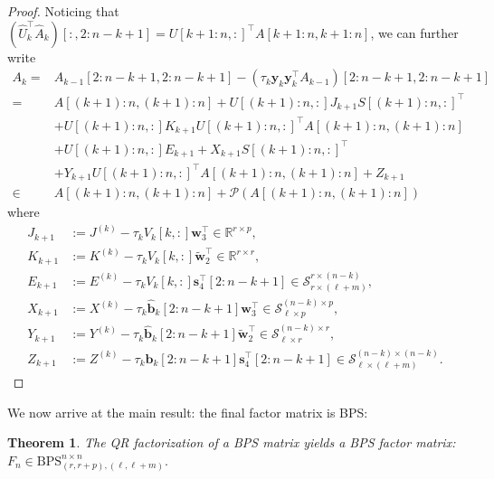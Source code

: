 \documentclass[a4paper,fleqn]{cas-sc}
\newtheorem{mytheorem}{Theorem}
\def\calP{{\mathcal P}}
\def\calS{{\mathcal S}}
\def\bfy{{\mathbf y}}
\def\bfb{{\mathbf b}}
\def\bfs{{\mathbf s}}
\def\bfw{{\mathbf w}}
\begin{document}
\begin{proof}
Noticing that $(\hat U_k^\top \hat A_k)[:,2:n-k+1]= U[k+1:n,:]^\top A[k+1:n,k+1:n]$, we can further write 
\begin{align*}
    A_k=&A_{k-1}[2:n-k+1,2:n-k+1]-(\tau_k \bfy_k \bfy_k^\top A_{k-1})[2:n-k+1,2:n-k+1] \\
    =& A[(k\!+\!1)\!:\!n,(k\!+\!1)\!:\!n] + U[(k\!+\!1)\!:\!n,:]J_{k+1}S[(k\!+\!1)\!:\!n,:]^\top \\&+U[(k\!+\!1)\!:\!n,:] K_{k+1}U[(k\!+\!1)\!:\!n,:]^\top A[(k\!+\!1)\!:\!n,(k\!+\!1)\!:\!n] \\&
    +U[(k\!+\!1)\!:\!n,:] E_{k+1} + X_{k+1}S[(k\!+\!1)\!:\!n,:]^\top \\&
    + Y_{k+1}U[(k\!+\!1)\!:\!n,:]^\top A[(k\!+\!1)\!:\!n,(k\!+\!1)\!:\!n] + Z_{k+1} \\
    \in & A[(k+1)\!:\!n,(k+1)\!:\!n]+\calP(A[(k+1)\!:\!n,(k+1)\!:\!n])
\end{align*}
where
\begin{align}
    J_{k+1} &:= J^{(k)} - \tau_kV_k[k,:] \bfw_3^\top \in \mathbb R^{r\times p}, \label{eq:submatrix_update_J} \\
    K_{k+1} &:= K^{(k)} - \tau_kV_k[k,:]\tilde \bfw_2^\top \in \mathbb R^{r\times r}, \label{eq:submatrix_update_K} \\
    E_{k+1} &:= E^{(k)} - \tau_k V_k[k,:] \bfs_4^\top[2:n-k+1] \in \calS_{r\times(\ell+m)}^{r\times(n-k)},\label{eq:submatrix_update_E} \\
    X_{k+1} &:= X^{(k)} - \tau_k \hat \bfb_k[2:n-k+1]\bfw_3^\top \in \calS_{\ell \times p}^{(n-k)\times p}, \label{eq:submatrix_update_X} \\
    Y_{k+1} &:= Y^{(k)} - \tau_k\hat \bfb_k[2:n-k+1] \tilde \bfw_2^\top \in \calS_{\ell \times r}^{(n-k) \times r}  \label{eq:submatrix_update_Y}, \\
    Z_{k+1} &:= Z^{(k)} - \tau_k \hat \bfb_k[2:n-k+1]\bfs_4^\top [2:n-k+1] \in \calS_{\ell \times (\ell+m)}^{(n-k)\times(n-k)}. \label{eq:submatrix_update_Z}
\end{align}

\end{proof}

We now arrive at the main result: the final factor matrix is BPS:

\begin{mytheorem}\label{thm:structure_preserve}
    The QR factorization of a BPS matrix yields a BPS factor matrix:
$
F_n \in {\mathrm{BPS}}_{(r,r+p),(\ell,\ell+m)}^{n \times n}.
$

\end{mytheorem}
\end{document}
